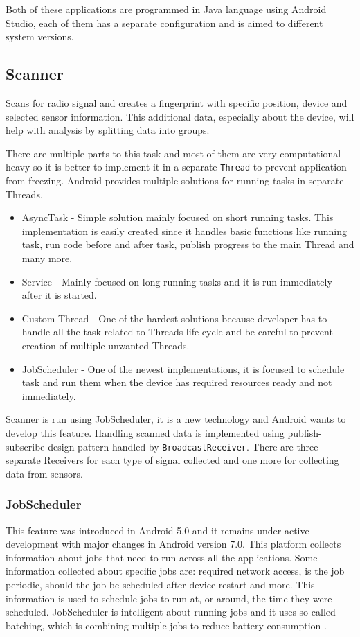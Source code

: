 Both of these applications are programmed in Java language using Android Studio, each of them has a separate configuration and is aimed to different system versions.

\subsection{Scanner}\label{subsec:Scanner}
Scans for radio signal and creates a fingerprint with specific position, device and selected sensor information. This additional data, especially about the device, will help with analysis by splitting data into groups.

There are multiple parts to this task and most of them are very computational heavy so it is better to implement it in a separate \verb|Thread| to prevent application from freezing. Android provides multiple solutions for running tasks in separate Threads.

\begin{itemize}
	\item AsyncTask - Simple solution mainly focused on short running tasks. This implementation is easily created since it handles basic functions like running task, run code before and after task, publish progress to the main Thread and many more.
	\item Service - Mainly focused on long running tasks and it is run immediately after it is started.
	\item Custom Thread - One of the hardest solutions because developer has to handle all the task related to Threads life-cycle and be careful to prevent creation of multiple unwanted Threads.
	\item JobScheduler - One of the newest implementations, it is focused to schedule task and run them when the device has required resources ready and not immediately.
\end{itemize}

Scanner is run using JobScheduler, it is a new technology and Android wants to develop this feature. Handling scanned data is implemented using publish-subscribe design pattern handled by \verb|BroadcastReceiver|. There are three separate Receivers for each type of signal collected and one more for collecting data from sensors. 

\subsubsection{JobScheduler}\label{subsubsec:JobScheduler}
This feature was introduced in Android 5.0 and it remains under active development with major changes in Android version 7.0. This platform collects information about jobs that need to run across all the applications. Some information collected about specific jobs are: required network access, is the job periodic, should the job be scheduled after device restart and more. This information is used to schedule jobs to run at, or around, the time they were scheduled. JobScheduler is intelligent about running jobs and it uses so called batching, which is combining multiple jobs to reduce battery consumption \cite{AD, SOTAJS}.

